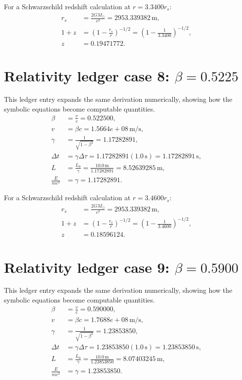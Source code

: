 \documentclass[11pt,a4paper]{article}
\begin{document}
For a Schwarzschild redshift calculation at $r=3.3400r_s$:
\begin{align}
r_s &= \frac{2GM_\odot}{c^2}=2953.339382\,\mathrm{m},\\
1+z &= \left(1-\frac{r_s}{r}\right)^{-1/2}
=\left(1-\frac{1}{3.3400}\right)^{-1/2},\\
z&=0.19471772.
\end{align}

\section{Relativity ledger case 8: $\beta=0.5225$}
This ledger entry expands the same derivation numerically, showing how the symbolic equations become computable quantities.
\begin{align}
\beta &= \frac{v}{c}=0.522500,\\
v &= \beta c = 1.5664e+08\,\mathrm{m/s},\\
\gamma &= \frac{1}{\sqrt{1-\beta^2}} = 1.17282891,\\
\Delta t &= \gamma\Delta\tau = 1.17282891(1.0\,\mathrm{s}) = 1.17282891\,\mathrm{s},\\
L &= \frac{L_0}{\gamma} = \frac{10.0\,\mathrm{m}}{1.17282891} = 8.52639285\,\mathrm{m},\\
\frac{E}{mc^2}&=\gamma=1.17282891.
\end{align}

For a Schwarzschild redshift calculation at $r=3.4600r_s$:
\begin{align}
r_s &= \frac{2GM_\odot}{c^2}=2953.339382\,\mathrm{m},\\
1+z &= \left(1-\frac{r_s}{r}\right)^{-1/2}
=\left(1-\frac{1}{3.4600}\right)^{-1/2},\\
z&=0.18596124.
\end{align}

\newpage

\section{Relativity ledger case 9: $\beta=0.5900$}
This ledger entry expands the same derivation numerically, showing how the symbolic equations become computable quantities.
\begin{align}
\beta &= \frac{v}{c}=0.590000,\\
v &= \beta c = 1.7688e+08\,\mathrm{m/s},\\
\gamma &= \frac{1}{\sqrt{1-\beta^2}} = 1.23853850,\\
\Delta t &= \gamma\Delta\tau = 1.23853850(1.0\,\mathrm{s}) = 1.23853850\,\mathrm{s},\\
L &= \frac{L_0}{\gamma} = \frac{10.0\,\mathrm{m}}{1.23853850} = 8.07403245\,\mathrm{m},\\
\frac{E}{mc^2}&=\gamma=1.23853850.
\end{align}
\end{document}

